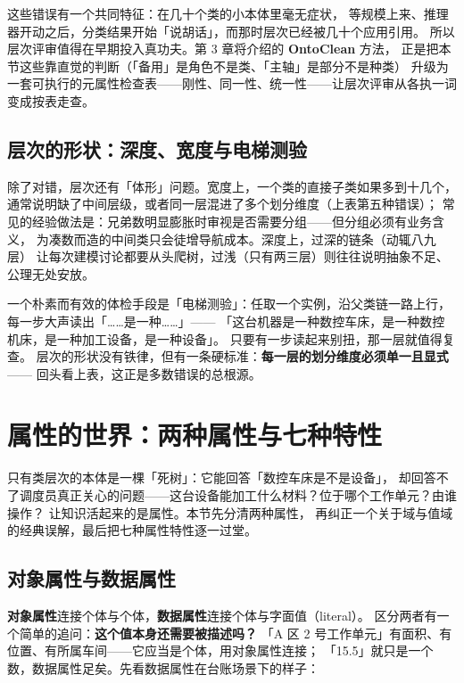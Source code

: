 这些错误有一个共同特征：在几十个类的小本体里毫无症状，
等规模上来、推理器开动之后，分类结果开始「说胡话」，而那时层次已经被几十个应用引用。
所以层次评审值得在早期投入真功夫。第 3 章将介绍的 \textbf{OntoClean} 方法，
正是把本节这些靠直觉的判断（「备用」是角色不是类、「主轴」是部分不是种类）
升级为一套可执行的元属性检查表——刚性、同一性、统一性——让层次评审从各执一词变成按表走查。

\subsection{层次的形状：深度、宽度与电梯测验}

除了对错，层次还有「体形」问题。宽度上，一个类的直接子类如果多到十几个，
通常说明缺了中间层级，或者同一层混进了多个划分维度（上表第五种错误）；
常见的经验做法是：兄弟数明显膨胀时审视是否需要分组——但分组必须有业务含义，
为凑数而造的中间类只会徒增导航成本。深度上，过深的链条（动辄八九层）
让每次建模讨论都要从头爬树，过浅（只有两三层）则往往说明抽象不足、公理无处安放。

一个朴素而有效的体检手段是「电梯测验」：任取一个实例，沿父类链一路上行，
每一步大声读出「……是一种……」——
「这台机器是一种数控车床，是一种数控机床，是一种加工设备，是一种设备」。
只要有一步读起来别扭，那一层就值得复查。
层次的形状没有铁律，但有一条硬标准：\textbf{每一层的划分维度必须单一且显式}——
回头看上表，这正是多数错误的总根源。

\section{属性的世界：两种属性与七种特性}

只有类层次的本体是一棵「死树」：它能回答「数控车床是不是设备」，
却回答不了调度员真正关心的问题——这台设备能加工什么材料？位于哪个工作单元？由谁操作？
让知识活起来的是属性。本节先分清两种属性，
再纠正一个关于域与值域的经典误解，最后把七种属性特性逐一过堂。

\subsection{对象属性与数据属性}

\textbf{对象属性}连接个体与个体，\textbf{数据属性}连接个体与字面值（literal）。
区分两者有一个简单的追问：\textbf{这个值本身还需要被描述吗？}
「A 区 2 号工作单元」有面积、有位置、有所属车间——它应当是个体，用对象属性连接；
「15.5」就只是一个数，数据属性足矣。先看数据属性在台账场景下的样子：



